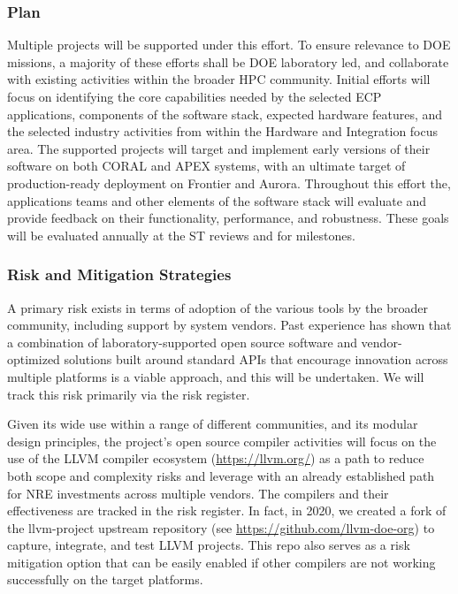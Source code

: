 \subsubsection{Plan}
Multiple projects will be supported under this effort. To ensure relevance to DOE missions, a majority of these efforts shall be DOE laboratory led, and collaborate with existing activities within the broader HPC community. 
Initial efforts will focus on identifying the core capabilities needed by the selected ECP applications, components of the software stack, expected hardware features, and the selected industry activities from within the Hardware and Integration focus area. 
The supported projects will target and implement early versions of their software on both CORAL and APEX systems, with an ultimate target of production-ready deployment on Frontier and Aurora. 
Throughout this effort the, applications teams and other elements of the software stack will evaluate and provide feedback on their functionality, performance, and robustness. 
These goals will be evaluated annually at the ST reviews and for milestones.

\subsubsection{Risk and Mitigation Strategies}

A primary risk exists in terms of adoption of the various tools by the broader community, including support by system vendors. Past experience has shown that a combination of laboratory-supported open source software and vendor-optimized solutions built around standard APIs that encourage innovation across multiple platforms is a viable approach, and this will be undertaken. 
We will track this risk primarily via the risk register.

Given its wide use within a range of different communities, and its modular design principles, the project's open source compiler activities will focus on the use of the LLVM compiler ecosystem (\url{https://llvm.org/}) as a path to reduce both scope and complexity risks and leverage with an already established path for NRE investments across multiple vendors. 
The compilers and their effectiveness are tracked in the risk register. 
%
In fact, in 2020, we created a fork of the llvm-project upstream repository (see \url{https://github.com/llvm-doe-org}) to capture, integrate, and test LLVM projects. This repo also serves as a risk mitigation option that can be easily enabled if other compilers are not working successfully on the target platforms.

